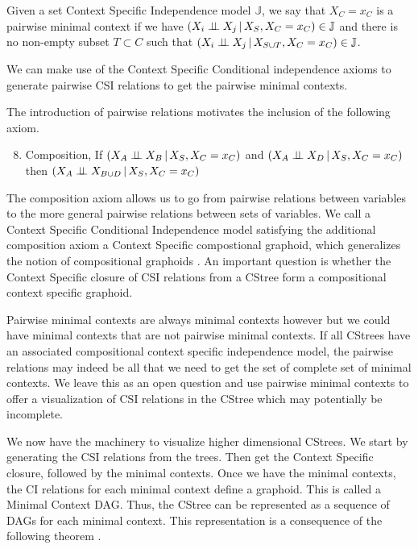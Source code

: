 \documentclass{tufte-book}
\begin{document}
\begin{definition}\label{def:pairmcs}
Given a set Context Specific Independence model $\mathbb{J}$, we say that ${X_C=x_C}$ is a pairwise minimal context if we have $(X_i  \perp \!\!\! \perp X_j \,|\, X_S, X_C=x_C) \in \mathbb{J}$ and there is no non-empty subset $T \subset C$ such that $(X_i \perp \!\!\! \perp X_j \,|\, X_{S \cup T}, X_C=x_C) \in \mathbb{J}$.
\end{definition}

We can make use of the Context Specific Conditional independence axioms to generate pairwise CSI relations to get the pairwise minimal contexts.


The introduction of pairwise relations motivates the inclusion of the following axiom.
\begin{enumerate}
\setcounter{enumi}{7}
\item Composition, If \((X_A \perp \!\!\! \perp X_B \,|\, X_S, X_C=x_C)\) and \((X_A \perp \!\!\! \perp X_D \,|\,X_S,X_C=x_C)\) then \((X_A \perp \!\!\! \perp X_{B\cup D} \,|\,X_S,X_C=x_C)\)
\end{enumerate}


The composition axiom allows us to go from pairwise relations between variables to the more general pairwise relations between sets of variables. We call a Context Specific Conditional Independence model satisfying the additional composition axiom a Context Specific compostional graphoid, which generalizes the notion of compositional graphoids \cite{sadeghi-2014-markov-proper}. An important question is whether the Context Specific closure of CSI relations from a CStree form a compositional context specific graphoid.


Pairwise minimal contexts are always minimal contexts however but we could have minimal contexts that are not pairwise minimal contexts. If all CStrees have an associated compositional context specific independence model, the pairwise relations may indeed be all that we need to get the set of complete set of minimal contexts. We leave this as an open question and use pairwise minimal contexts to offer a visualization of CSI relations in the CStree which may potentially be incomplete.



We now have the machinery to visualize higher dimensional CStrees. We start by generating the CSI relations from the trees. Then get the Context Specific closure, followed by the minimal contexts. Once we have the minimal contexts, the CI relations for each minimal context define a graphoid. This is called a Minimal Context DAG. Thus, the CStree can be represented as a sequence of DAGs for each minimal context. This representation is a consequence of the following theorem \cite{duarte-2021-repres-learn}.
\end{document}
